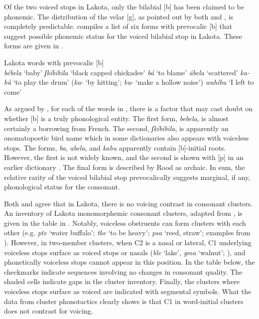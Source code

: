 \documentclass[output=paper]{langscibook}
\begin{document}
Of the two voiced stops in Lakota, only the bilabial [b] has been claimed to be phonemic. The distribution of the velar [g], as pointed out by both \citet{Rood2016} and \citet{BlevinsEtAl2020}, is completely predictable. \citet[235]{Rood2016} compiles a list of six forms with prevocalic [b] that suggest possible phonemic status for the voiced bilabial stop in Lakota. These forms are given in .

\ea
\label{ex:schwartz:3}Lakota words with prevocalic [b] \citep[235]{Rood2016}\\
  \ea \textit{bébela} ‘baby’
  \ex \textit{ʃkíbibila} ‘black capped chickadee’
  \ex \textit{bá} ‘to blame’
  \ex \textit{ábela} ‘scattered’
  \ex \textit{ka-bú} ‘to play the drum’ (\textit{ka}- ‘by hitting’; \textit{bu}- ‘make a hollow noise’)
  \ex \textit{wahíbu} ‘I left to come’
  \z
\z

As argued by \citet[36]{Rood2016}, for each of the words in , there is a factor that may cast doubt on whether [b] is a truly phonological entity. The first form, \textit{bebela}, is almost certainly a borrowing from French. The second, \textit{ʃkíbibila}, is apparently an onomatopoetic bird name which in some dictionaries also appears with voiceless stops. The forms, \textit{ba}, \textit{abela}, and \textit{kabu} apparently contain [b]-initial roots. However, the first is not widely known, and the second is shown with [p] in an earlier dictionary \citep[36]{Rood2016}. The final form is described by Rood as archaic. In sum, the relative rarity of the voiced bilabial stop prevocalically suggests marginal, if any, phonological status for the consonant.

Both \citeauthor{Rood2016} and \citeauthor{BlevinsEtAl2020} agree that in Lakota, there is no voicing contrast in consonant clusters. An inventory of Lakota monomorphemic consonant clusters, adapted from \citet[302]{BlevinsEtAl2020}, is given in the table in . Notably, voiceless obstruents can form clusters with each other (e.g. \textit{pte} ‘water buffalo’; \textit{tke} ‘to be heavy’; \textit{psa} ‘reed, straw’; examples from \citealt[302]{BlevinsEtAl2020}). However, in two-member clusters, when C2 is a nasal or lateral, C1 underlying voiceless stops surface as voiced stops or nasals (\textit{ble} ‘lake’, \textit{gma} ‘walnut’; \citealt[302]{BlevinsEtAl2020}), and phonetically voiceless stops cannot appear in this position. In the table below, the checkmarks indicate sequences involving no changes in consonant quality. The shaded cells indicate gaps in the cluster inventory. Finally, the clusters where voiceless stops surface as voiced are indicated with segmental symbols. What the data from cluster phonotactics clearly shows is that C1 in word-initial clusters does not contrast for voicing.
\end{document}
